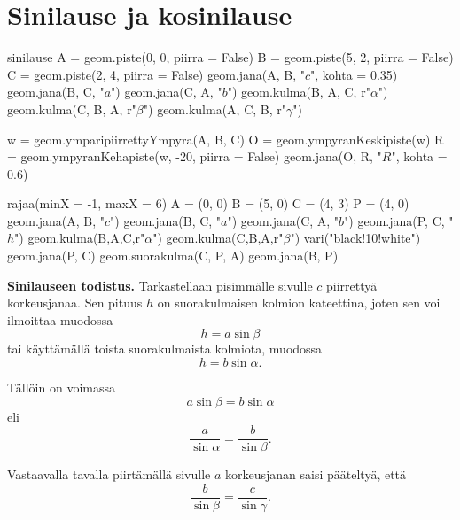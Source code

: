 \section*{Sinilause ja kosinilause}

\begin{luoKuva}{sinilause}
A = geom.piste(0, 0, piirra = False)
B = geom.piste(5, 2, piirra = False)
C = geom.piste(2, 4, piirra = False)
geom.jana(A, B, "$c$", kohta = 0.35)
geom.jana(B, C, "$a$")
geom.jana(C, A, "$b$")
geom.kulma(B, A, C, r"$\alpha$")
geom.kulma(C, B, A, r"$\beta$")
geom.kulma(A, C, B, r"$\gamma$")

w = geom.ymparipiirrettyYmpyra(A, B, C)
O = geom.ympyranKeskipiste(w)
R = geom.ympyranKehapiste(w, -20, piirra = False)
geom.jana(O, R, "$R$", kohta = 0.6)
\end{luoKuva}


\begin{center}
 \begin{kuva}
	rajaa(minX = -1, maxX = 6)
	A = (0, 0)
	B = (5, 0)
	C = (4, 3)
	P = (4, 0)
	geom.jana(A, B, "$c$")
	geom.jana(B, C, "$a$")
	geom.jana(C, A, "$b$")
	geom.jana(P, C, "$h$")
	geom.kulma(B,A,C,r"$\alpha$")
	geom.kulma(C,B,A,r"$\beta$")
	vari("black!10!white")
	geom.jana(P, C)
	geom.suorakulma(C, P, A)
	geom.jana(B, P)
\end{kuva}
\end{center}


\textbf{Sinilauseen todistus.} Tarkastellaan pisimmälle sivulle $c$ piirrettyä korkeusjanaa.
Sen pituus $h$ on suorakulmaisen kolmion kateettina, joten sen voi ilmoittaa muodossa
\[
h = a \sin \beta
\]
tai käyttämällä toista suorakulmaista kolmiota, muodossa
\[
h = b \sin \alpha .
\]

Tällöin on voimassa
\[
a \sin \beta = b \sin \alpha
\]
eli
\[
\frac{a}{\sin \alpha} = \frac{b}{\sin \beta}.
\]

Vastaavalla tavalla piirtämällä sivulle $a$ korkeusjanan saisi pääteltyä, että
\[
\frac{b}{\sin \beta} = \frac{c}{\sin \gamma}.
\]

